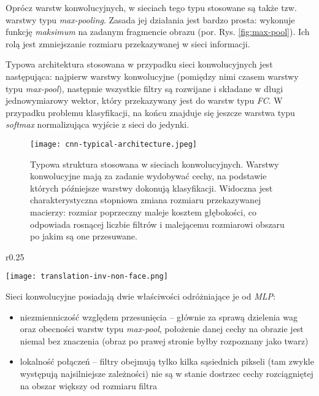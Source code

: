 Oprócz warstw konwolucyjnych, w sieciach tego typu stosowane są także tzw. warstwy typu \textit{max-pooling}. Zasada jej działania jest bardzo prosta: wykonuje funkcję \textit{maksimum} na zadanym fragmencie obrazu (por. Rys. \ref{fig:max-pool}). Ich rolą jest zmniejszanie rozmiaru przekazywanej w sieci informacji.

Typowa architektura stosowana w przypadku sieci konwolucyjnych jest następująca: najpierw warstwy konwolucyjne (pomiędzy nimi czasem warstwy typu \textit{max-pool}), następnie wszystkie filtry są rozwijane i składane w długi jednowymiarowy wektor, który przekazywany jest do warstw typu \textit{FC}. W przypadku problemu klasyfikacji, na końcu znajduje się jeszcze warstwa typu \textit{softmax} normalizująca wyjście z sieci do jedynki.

\begin{figure}[h]
	\centering
	\texttt{[image: cnn-typical-architecture.jpeg]}
	\caption{Typowa struktura stosowana w sieciach konwolucyjnych. Warstwy konwolucyjne mają za zadanie wydobywać cechy, na podstawie których późniejsze warstwy dokonują klasyfikacji.
	Widoczna jest charakterystyczna stopniowa zmiana rozmiaru przekazywanej macierzy: rozmiar poprzeczny maleje kosztem głębokości, co odpowiada rosnącej liczbie filtrów i malejącemu rozmiarowi obszaru po jakim są one przesuwane.}
	\label{fig:cnn-arch}
\end{figure}



\begin{wrapfigure}[9]{r}{0.25\textwidth}
  \begin{center}
  	\vspace{-1em}
	\texttt{[image: translation-inv-non-face.png]}
   	\label{fig:translation-inv-nonface}
  \end{center}
\end{wrapfigure}

Sieci konwolucyjne posiadają dwie właściwości odróżniające je od \textit{MLP}:
\begin{itemize}
	\item niezmienniczość względem przesunięcia  -- głównie za sprawą dzielenia wag oraz obecności warstw typu \textit{max-pool}, położenie danej cechy na obrazie jest niemal bez znaczenia (obraz po prawej stronie byłby rozpoznany jako twarz)
	\item lokalność połączeń -- filtry obejmują tylko kilka sąsiednich pikseli (tam zwykle występują najsilniejsze zależności) nie są w stanie dostrzec cechy rozciągniętej na obszar większy od rozmiaru filtra
\end{itemize}

